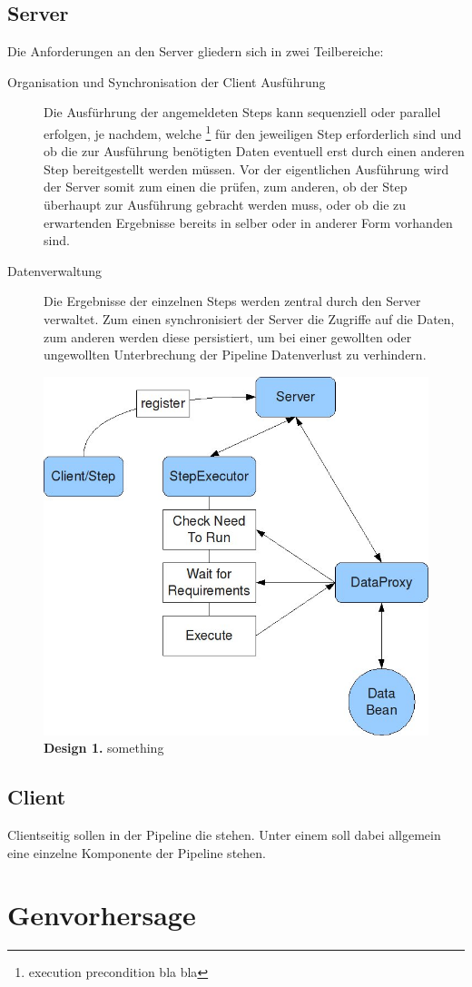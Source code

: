 \subsection{Server}
Die Anforderungen an den Server gliedern sich in zwei Teilbereiche:
\begin{description}
\item[Organisation und Synchronisation der Client Ausführung]
Die Ausfürhrung der angemeldeten Steps kann sequenziell oder
parallel erfolgen, je nachdem, welche 
\footnote{execution precondition bla bla} für den jeweiligen Step
erforderlich sind und ob die zur Ausführung benötigten Daten eventuell erst
durch einen anderen Step bereitgestellt werden müssen. Vor der eigentlichen
Ausführung wird der Server somit zum einen die 
prüfen, zum anderen, ob der Step überhaupt zur Ausführung
gebracht werden muss, oder ob die zu erwartenden Ergebnisse bereits in selber
oder in anderer Form vorhanden sind.
\item[Datenverwaltung] Die Ergebnisse der einzelnen Steps werden zentral durch
den Server verwaltet.
Zum einen synchronisiert der Server die Zugriffe auf die Daten, zum anderen
werden diese persistiert, um bei einer gewollten oder ungewollten Unterbrechung
der Pipeline Datenverlust zu verhindern.
\end{description}

\begin{figure}[htbp]
	\begin{center}
		\includegraphics[scale=0.6]{pics/programOrganisationOverview3ScaledWithAlpha.jpg}
	\caption[Design 1]{
	\textbf{Design 1.}
	something}
	\end{center}
	\label{fig:programOrganisationOverview3ScaledWithAlpha}
\end{figure}

\subsection{Client}
Clientseitig sollen in der Pipeline die  stehen.
Unter einem  soll dabei allgemein eine einzelne Komponente der
Pipeline stehen.
\section{Genvorhersage}
